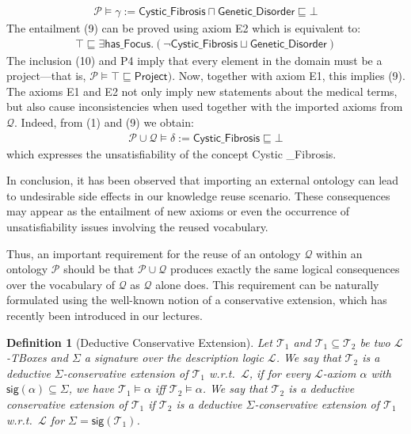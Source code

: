 \documentclass[12pt,a4paper]{article}
\newtheorem{definition}{Definition}
\newcommand{\sig}{\textsf{sig}\xspace}
\newenvironment{problems}[2][{\color{purple}Question}]{\begin{trivlist}
\item[\hskip \labelsep {\bfseries #1}\hskip \labelsep {\bfseries #2.}]}{\end{trivlist}}
\begin{document}
\begin{problems}{{\color{purple}6 (with 1 bonus mark)}}
\begin{align}
\mathcal{P}\models\gamma:=\textsf{Cystic\_Fibrosis}\sqcap\textsf{Genetic\_Disorder}\sqsubseteq\bot
\end{align}
The entailment (9) can be proved using axiom \textsf{E2} which is equivalent to:
\begin{align}
\top\sqsubseteq\exists\textsf{has\_Focus}.(\neg\textsf{Cystic\_Fibrosis}\sqcup\textsf{Genetic\_Disorder})
\end{align}
The inclusion (10) and \textsf{P4} imply that every element in the domain must be a project---that is, $\mathcal{P}\models\top\sqsubseteq\textsf{Project})$. Now, together with axiom \textsf{E1}, this implies (9). The axioms \textsf{E1} and \textsf{E2} not only imply new statements about the medical terms, but also cause inconsistencies when used together with the imported axioms from $\mathcal{Q}$. Indeed, from (1) and (9) we obtain: 
\begin{align}
\mathcal{P}\cup\mathcal{Q}\models\delta:=\textsf{Cystic\_Fibrosis}\sqsubseteq\bot
\end{align}which expresses the unsatisfiability of the concept \textsf{Cystic
\_Fibrosis}.

In conclusion, it has been observed that importing an external ontology can lead to undesirable side effects in our knowledge reuse scenario. These consequences may appear as the entailment of new axioms or even the occurrence of unsatisfiability issues involving the reused vocabulary.

Thus, an important requirement for the reuse of an ontology $\mathcal{Q}$ within an ontology $\mathcal{P}$ should be that $\mathcal{P}\cup\mathcal{Q}$ produces exactly the same logical consequences over the vocabulary of $\mathcal{Q}$ as $\mathcal{Q}$ alone does. This requirement can be naturally formulated using the well-known notion of a conservative extension, which has recently been introduced in our lectures.

\begin{definition}[Deductive Conservative Extension]
Let $\mathcal{T}_{1}$ and $\mathcal{T}_{1}\subseteq\mathcal{T}_{2}$ be two $\mathcal{L}$-TBoxes and $\Sigma$ a signature over the description logic $\mathcal{L}$. We say that $\mathcal{T}_{2}$ is a \emph{deductive $\Sigma$-conservative extension} of $\mathcal{T}_{1}$ w.r.t.\ $\mathcal{L}$, if for every $\mathcal{L}$-axiom $\alpha$ with $\sig(\alpha)\subseteq\Sigma$, we have $\mathcal{T}_{1}\models\alpha$ iff $\mathcal{T}_{2}\models\alpha$. We say that $\mathcal{T}_{2}$ is a deductive conservative extension of $\mathcal{T}_{1}$ if $\mathcal{T}_{2}$ is a deductive $\Sigma$-conservative extension of $\mathcal{T}_{1}$ w.r.t.\ $\mathcal{L}$ for $\Sigma=\sig(\mathcal{T}_{1})$.
\label{def1}
\end{definition}


\end{problems}
\end{document}
